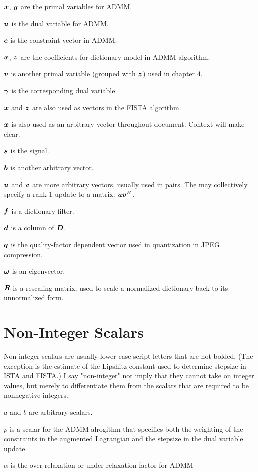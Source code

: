 \documentclass{article}
\begin{document}
$\bm{x}$, $\bm{y}$ are the primal variables for ADMM.

$\bm{u}$ is the dual variable for ADMM.

$\bm{c}$ is the constraint vector in ADMM.

$\bm{x}$, $\bm{z}$ are the coefficients for dictionary model in ADMM algorithm.

$\bm{v}$ is another primal variable (grouped with $\bm{z}$) used in chapter $4$.

$\bm{\gamma}$ is the corresponding dual variable.

$\bm{x}$ and $\bm{z}$ are also used as vectors in the FISTA algorithm.

$\bm{x}$ is also used as an arbitrary vector throughout document.  Context will make clear.

$\bm{s}$ is the signal.

$\bm{b}$ is another arbitrary vector.

$\bm{u}$ and $\bm{v}$ are more arbitrary vectors, usually used in pairs. The may collectively specify a rank-$1$ update to a matrix: $\bm{u}\bm{v}^H$.

$\bm{f}$ is a dictionary filter.

$\bm{d}$ is a column of $\bm{D}$.

$\bm{q}$ is the quality-factor dependent vector used in quantization in JPEG compression.

$\bm{\omega}$ is an eigenvector.

$\bm{R}$ is a rescaling matrix, used to scale a normalized dictionary back to its unnormalized form.



\section{Non-Integer Scalars}
Non-integer scalars are usually lower-case script letters that are not bolded. (The exception is the estimate of the Lipshitz constant used to determine stepsize in ISTA and FISTA.) I say "non-integer" not imply that they cannot take on integer values, but merely to differentiate them from the scalars that are required to be nonnegative integers.

$a$ and $b$ are arbitrary scalars.

$\rho$ is a scalar for the ADMM alrogithm that specifies both the weighting of the constraints in the augmented Lagrangian and the stepsize in the dual variable update.

$\alpha$ is the over-relaxation or under-relaxation factor for ADMM
\end{document}
